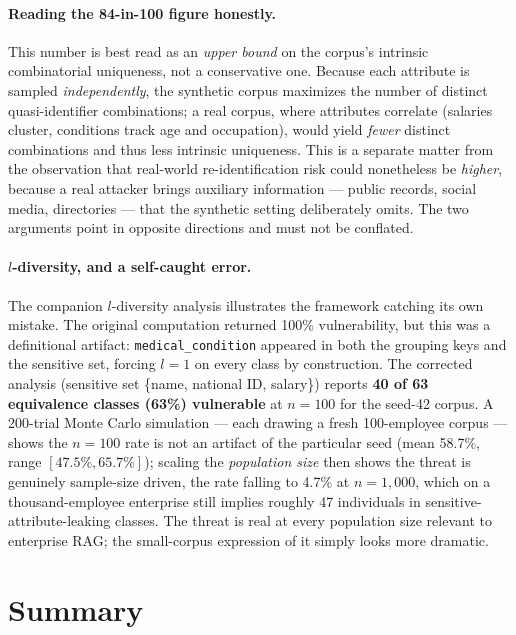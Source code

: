 \paragraph{Reading the 84-in-100 figure honestly.} This number is best read as an \emph{upper
bound} on the corpus's intrinsic combinatorial uniqueness, not a conservative one. Because each
attribute is sampled \emph{independently}, the synthetic corpus maximizes the number of distinct
quasi-identifier combinations; a real corpus, where attributes correlate (salaries cluster,
conditions track age and occupation), would yield \emph{fewer} distinct combinations and thus
less intrinsic uniqueness. This is a separate matter from the observation that real-world
re-identification risk could nonetheless be \emph{higher}, because a real attacker brings
auxiliary information --- public records, social media, directories --- that the synthetic setting
deliberately omits. The two arguments point in opposite directions and must not be conflated.

\paragraph{$l$-diversity, and a self-caught error.} The companion $l$-diversity analysis
illustrates the framework catching its own mistake. The original computation returned 100\%
vulnerability, but this was a definitional artifact: \texttt{medical\_condition} appeared in both
the grouping keys and the sensitive set, forcing $l = 1$ on every class by construction. The
corrected analysis (sensitive set \{name, national ID, salary\}) reports \textbf{40 of 63
equivalence classes (63\%) vulnerable} at $n = 100$ for the seed-42 corpus. A 200-trial Monte
Carlo simulation --- each drawing a fresh 100-employee corpus --- shows the $n = 100$ rate is not
an artifact of the particular seed (mean 58.7\%, range $[47.5\%, 65.7\%]$); scaling the
\emph{population size} then shows the threat is genuinely sample-size driven, the rate falling to
4.7\% at $n = 1{,}000$, which on a thousand-employee enterprise still implies roughly 47
individuals in sensitive-attribute-leaking classes. The threat is real at every population size
relevant to enterprise RAG; the small-corpus expression of it simply looks more dramatic.


\section{Summary}
\label{sec:ch3-formal-summary}

